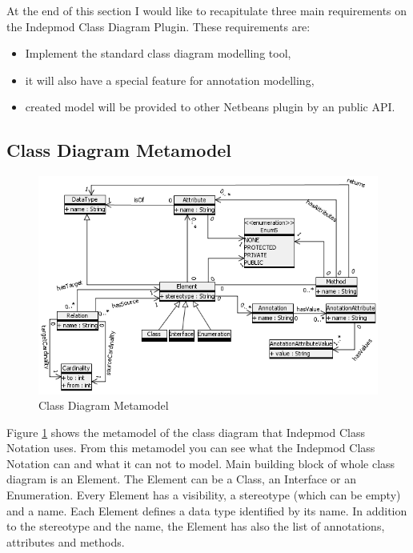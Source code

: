 At the end of this section I would like to recapitulate three main requirements on the Indepmod Class Diagram Plugin. These requirements are:
\begin{itemize}
    \item Implement the standard class diagram modelling tool,
    \item it will also have a special feature for annotation modelling,
    \item created model will be provided to other Netbeans plugin by an public API.
\end{itemize}

\subsection{Class Diagram Metamodel}
\label{section-metamodel}

\begin{figure}[!ht]
\begin{center}
\includegraphics[scale=1]{img/classDiagramMetamodel.png}
\caption{Class Diagram Metamodel}
\label{f-classDiagramMetamodel}
\end{center}
\end{figure}

Figure \ref{f-classDiagramMetamodel} shows the metamodel of the class diagram that Indepmod Class Notation uses. From this metamodel you can see what the Indepmod Class Notation can and what it can not to model. Main building block of whole class diagram is an Element. The Element can be a Class, an Interface or an Enumeration. Every Element has a visibility, a stereotype (which can be empty) and a name. Each Element defines a data type identified by its name. In addition to the stereotype and the name, the Element has also the list of annotations, attributes and methods.

